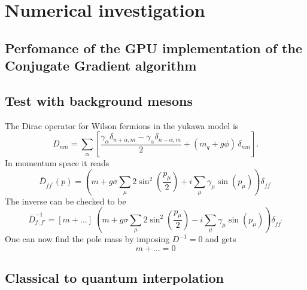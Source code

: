 \chapter{Numerical investigation}
\label{chapt:results}

\section{Perfomance of the GPU implementation of the Conjugate Gradient algorithm}

\section{Test with background mesons}

The Dirac operator for Wilson fermions in the yukawa model is
\begin{equation*}
D_{n m}=\sum_\alpha\left[\frac{\gamma_\alpha \delta_{n+\alpha, m} - \gamma_\alpha \delta_{n-\alpha, m}}{2} + (m_q + g \phi) \, \delta_{n m}\right] .
\end{equation*}
In momentum space it reads
\begin{equation*}
\bar{D}_{f f^{\prime}}(p)=\left(m+ g \sigma \sum_\mu 2 \sin ^2\left(\frac{p_\mu}{2}\right)+i \sum_\mu \gamma_\mu \sin \left(p_\mu\right)\right) \delta_{f f^{\prime}}
\end{equation*}
The inverse can be checked to be 
\begin{equation*}
    \bar D_{f,f'} ^{-1} = \left[m + \dots\right] \ \left(m+ g \sigma \sum_\mu 2 \sin ^2\left(\frac{p_\mu}{2}\right) - i \sum_\mu \gamma_\mu \sin \left(p_\mu\right)\right) \delta_{f f^{\prime}}
\end{equation*}
One can now find the pole mass by imposing $D^{-1} = 0$ and gets 
\begin{equation*}
    m + \dots = 0
\end{equation*}

\section{Classical to quantum interpolation}
\label{sec:classical_to_quantum}

